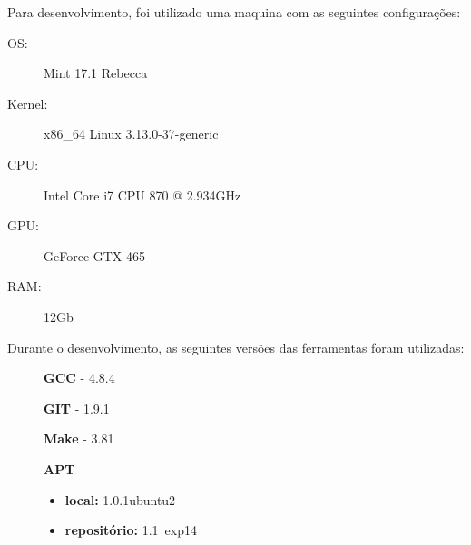 Para desenvolvimento, foi utilizado uma maquina com as seguintes configurações:

\begin{description}
	\item[OS:] Mint 17.1 Rebecca
	\item[Kernel:] x86\_64 Linux 3.13.0-37-generic
	\item[CPU:] Intel Core i7 CPU 870 @ 2.934GHz
	\item[GPU:] GeForce GTX 465
	\item[RAM:] 12Gb
\end{description}

Durante o desenvolvimento, as seguintes versões das ferramentas foram utilizadas:

\begin{description}
	\item[]\textbf{GCC} - 4.8.4
	\item[]\textbf{GIT} - 1.9.1
	\item[]\textbf{Make} - 3.81
	\item[]\textbf{APT}
	\begin{itemize}
		\item\textbf{local:} 1.0.1ubuntu2
		\item\textbf{repositório:} 1.1~exp14
	\end{itemize}
\end{description}
 